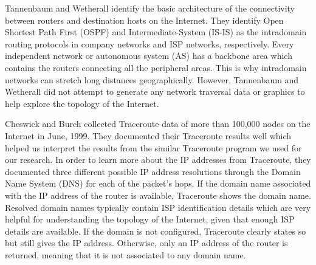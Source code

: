 \documentclass{sigcomm-alternate}
\begin{document}

Tannenbaum and Wetherall \cite{tannenbaum} identify the basic architecture of the connectivity between routers and destination hosts on the Internet. They identify Open Shortest Path First (OSPF) and Intermediate-System (IS-IS) as the intradomain routing protocols in company networks and ISP networks, respectively. Every independent network or autonomous system (AS) has a backbone area which contains the routers connecting all the peripheral areas. This is why intradomain networks can stretch long distances geographically. However, Tannenbaum and Wetherall did not attempt to generate any network traversal data or graphics to help explore the topology of the Internet. 


Cheswick and Burch \cite{ches} collected Traceroute data of more than 100,000 nodes on the Internet in June, 1999. They documented their Traceroute results well which helped us interpret the results from the similar Traceroute program we used for our research. In order to learn more about the IP addresses from Traceroute, they documented three different possible IP address resolutions through the Domain Name System (DNS) for each of the packet's hops. If the domain name associated with the IP address of the router is available, Traceroute shows the domain name. Resolved domain names typically contain ISP identification details which are very helpful for understanding the topology of the Internet, given that enough ISP details are available. If the domain is not configured, Traceroute clearly states so but still gives the IP address. Otherwise, only an IP address of the router is returned, meaning that it is not associated to any domain name.
\end{document}
